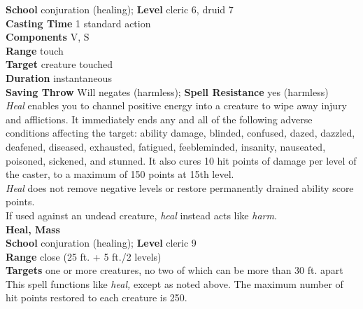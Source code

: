 \textbf{School} conjuration (healing); \textbf{Level} cleric 6, druid 7\\
\textbf{Casting Time} 1 standard action\\
\textbf{Components} V, S\\
\textbf{Range} touch\\
\textbf{Target} creature touched\\
\textbf{Duration} instantaneous\\
\textbf{Saving Throw }Will negates (harmless); \textbf{Spell Resistance} yes (harmless)\\
\textit{Heal }enables you to channel positive energy into a creature to wipe away injury and afflictions. It immediately ends any and all of the following adverse conditions affecting the target: ability damage, blinded, confused\textit{, }dazed, dazzled, deafened, diseased, exhausted, fatigued, feebleminded\textit{, }insanity, nauseated, poisoned, sickened, and stunned. It also cures 10 hit points of damage per level of the caster, to a maximum of 150 points at 15th level.\\
\textit{Heal }does not remove negative levels or restore permanently drained ability score points.\\
If used against an undead creature, \textit{heal }instead acts like \textit{harm}.\\
\textbf{Heal, Mass}\\
\textbf{School} conjuration (healing); \textbf{Level} cleric 9\\
\textbf{Range} close (25 ft. + 5 ft./2 levels)\\
\textbf{Targets} one or more creatures, no two of which can be more than 30 ft. apart\\
This spell functions like \textit{heal, }except as noted above. The maximum number of hit points restored to each creature is 250.\\
